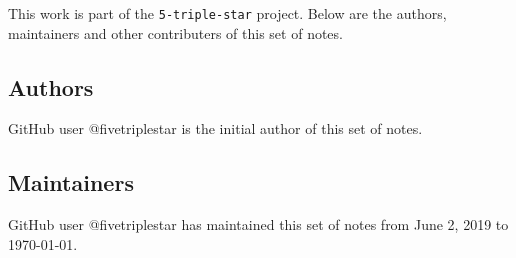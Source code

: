 This work is part of the \verb|5-triple-star| project. Below are the authors, maintainers and other contributers of this set of notes.
\subsection{Authors}
GitHub user @fivetriplestar is the initial author of this set of notes.

\subsection{Maintainers}
GitHub user @fivetriplestar has maintained this set of notes from June 2, 2019 to \today.
